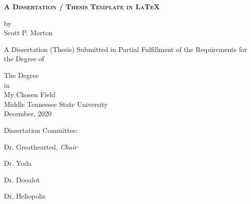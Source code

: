 \documentclass[12pt, oneside]{memoir}
\begin{document}
	\graphicspath{{./images/}}
	
	
	\frontmatter
	
	\thispagestyle{empty}
	\begin{center}
	\vspace{2.54cm}\normalsize
	\begin{Large} \begin{SingleSpace}\bfseries \scshape A Dissertation / Thesis Template in \LaTeX \end{SingleSpace}\end{Large}
	\vspace{1.27cm}\normalsize
	by\\Scott P. Morton
	\vspace{1.27cm}\normalsize
	\begin{SingleSpace}
	A Dissertation (Thesis) Submitted in Partial Fulfillment of the Requirements for the Degree of\\
	\end{SingleSpace}
	\vspace{1.27cm}\normalsize
	The Degree\\in\\My Chosen Field\\
	\vspace{1.27cm}\normalsize
	\vspace{1.27cm}\normalsize
	Middle Tennessee State University\\
	December, 2020
	\vspace{1.27cm}\normalsize
	\begin{SingleSpace}
        Dissertation Committee:
	\end{SingleSpace}
	\begin{list}{}{\setlength{\leftmargin}{13.25em}\setlength{\itemsep}{0pt}}
		\item Dr. Greathearted, \emph{Chair}
		\item Dr. Yoda
		\item Dr. Dooalot
		\item Dr. Heliopolis
	\end{list}
	\end{center}
	\newpage
\end{document}
